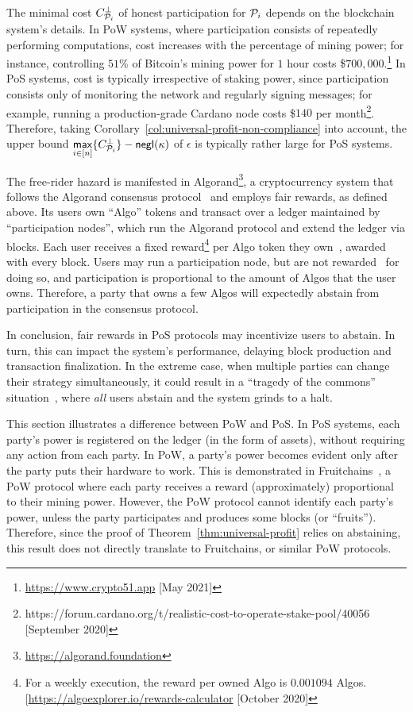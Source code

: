 The minimal cost $C^\bot_{\mathcal{P}_i}$ of honest participation for
$\mathcal{P}_i$ depends on the blockchain system's details. In PoW systems, where
participation consists of repeatedly performing computations, cost increases
with the percentage of mining power; for instance, controlling $51$\% of
Bitcoin's mining power for $1$ hour costs
\$$700,000$.\footnote{\url{https://www.crypto51.app} [May 2021]} In PoS
systems, cost is typically irrespective of staking power, since participation
consists only of monitoring the network and regularly signing messages; for
example, running a production-grade Cardano node costs \$$140$ per
month\footnote{https://forum.cardano.org/t/realistic-cost-to-operate-stake-pool/40056
[September 2020]}. Therefore, taking
Corollary~\ref{col:universal-profit-non-compliance} into account, the upper
bound $\underset{i \in [n]}{\mathsf{max}}\{C^\bot_{\mathcal{P}_i}\}
- \mathsf{negl}(\kappa)$ of $\epsilon$ is typically rather large for PoS
systems.

The free-rider hazard is manifested in
Algorand\footnote{\url{https://algorand.foundation}}, a cryptocurrency system
that follows the Algorand consensus
protocol~\cite{EPRINT:CGMV18,EPRINT:GHMVZ17} and employs fair rewards, as
defined above. Its users own ``Algo'' tokens and transact over a ledger
maintained by ``participation nodes'', which run the Algorand protocol and
extend the ledger via blocks. Each user receives a fixed reward\footnote{For a
weekly execution, the reward per owned Algo is $0.001094$ Algos.
[\url{https://algoexplorer.io/rewards-calculator} [October 2020]} per Algo
token they own~\cite{algorand-rewards}, awarded with every block.  Users
may run a participation node, but are not
rewarded~\cite{DBLP:conf/dsn/FooladgarMJR20} for doing so, and participation is
proportional to the amount of Algos that the user owns. Therefore, a party that
owns a few Algos will expectedly abstain from participation in the consensus
protocol.

In conclusion, fair rewards in PoS protocols may incentivize users to abstain.
In turn, this can impact the system's performance, \eg delaying block
production and transaction finalization. In the extreme case, when multiple
parties can change their strategy simultaneously, it could result in a
``tragedy of the commons'' situation~\cite{lloyd1833two}, where \emph{all}
users abstain and the system grinds to a halt.

\begin{remark*}
This section illustrates a difference between PoW and PoS. In
PoS systems, each party's power is registered on the ledger (in the form of
assets), without requiring any action from each party. In PoW, a party's power
becomes evident only after the party puts their hardware to work. This is
demonstrated in Fruitchains~\cite{PODC:PasShi17}, a PoW protocol where each
party receives a reward (approximately) proportional to their mining power.
However, the PoW protocol cannot identify each party's power, unless the party
participates and produces some blocks (or ``fruits''). Therefore, since the
proof of Theorem~\ref{thm:universal-profit} relies on abstaining, this result
does not directly translate to Fruitchains, or similar PoW protocols.
\end{remark*}
